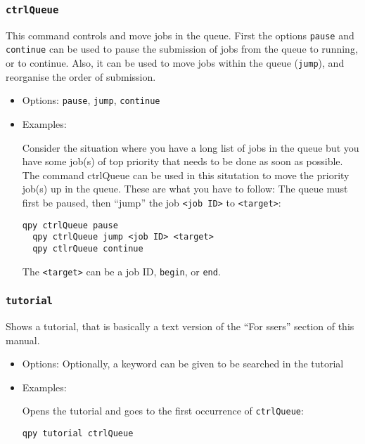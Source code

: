 \documentclass[a4paper,12pt]{article}
\begin{document}
\subsubsection{\texttt{ctrlQueue}}

This command controls and move jobs in the queue.
First the options \texttt{pause} and \texttt{continue} can be used to pause the submission of jobs from the queue to running, or to continue.
Also, it can be used to move jobs within the queue (\texttt{jump}), and reorganise the order of submission.

\begin{itemize}

\item Options: \texttt{pause}, \texttt{jump}, \texttt{continue}

\item Examples:

Consider the situation where you have a long list of jobs in the queue but you have some job(s) of top priority that needs to be done as soon as possible.
The command ctrlQueue can be used in this situtation to move the priority job(s) up in the queue.
These are what you have to follow:
The queue must first be paused, then ``jump'' the job \texttt{<job ID>} to \texttt{<target>}:

\begin{lstlisting}[style=BashStyle]
  qpy ctrlQueue pause
  qpy ctrlQueue jump <job ID> <target>
  qpy ctlrQueue continue
\end{lstlisting}

The \texttt{<target>} can be a job ID, \texttt{begin}, or \texttt{end}.

\end{itemize}

\subsubsection{\texttt{tutorial}}

Shows a tutorial, that is basically a text version of the ``For ssers'' section of this manual.

\begin{itemize}
\item Options: Optionally, a keyword can be given to be searched in the tutorial

\item Examples:

  Opens the tutorial and goes to the first occurrence of \texttt{ctrlQueue}:
  
  \begin{lstlisting}[style=BashStyle]
    qpy tutorial ctrlQueue
  \end{lstlisting}

\end{itemize}
\end{document}
